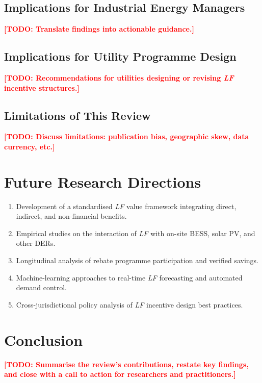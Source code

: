 \documentclass[12pt, a4paper, twocolumn]{article}
\newcommand{\LF}{\textit{LF}}
\newcommand{\TODO}[1]{\textcolor{red}{\textbf{[TODO: #1]}}}
\begin{document}
\subsection{Implications for Industrial Energy Managers}
\TODO{Translate findings into actionable guidance.}

\subsection{Implications for Utility Programme Design}
\TODO{Recommendations for utilities designing or revising \LF{} incentive structures.}

\subsection{Limitations of This Review}
\TODO{Discuss limitations: publication bias, geographic skew, data currency, etc.}


\section{Future Research Directions}
\label{sec:future}

\begin{enumerate}[nosep]
  \item Development of a standardised \LF{} value framework integrating direct, indirect, and non-financial benefits.
  \item Empirical studies on the interaction of \LF{} with on-site BESS, solar PV, and other DERs.
  \item Longitudinal analysis of rebate programme participation and verified savings.
  \item Machine-learning approaches to real-time \LF{} forecasting and automated demand control.
  \item Cross-jurisdictional policy analysis of \LF{} incentive design best practices.
\end{enumerate}


\section{Conclusion}
\label{sec:conclusion}

\TODO{Summarise the review's contributions, restate key findings, and close with a call to action for researchers and practitioners.}
\end{document}
